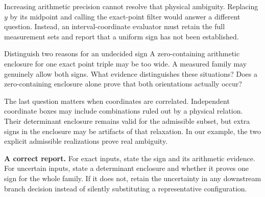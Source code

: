 Increasing arithmetic precision cannot resolve that physical ambiguity.
Replacing $y$ by its midpoint and calling the exact-point filter would
answer a different question. Instead, an interval-coordinate evaluator
must retain the full measurement sets and report that a uniform sign
has not been established.

\begin{question}{Distinguish two reasons for an undecided sign}
A zero-containing arithmetic enclosure for one exact point triple may be
too wide. A measured family may genuinely allow both signs. What evidence
distinguishes these situations? Does a zero-containing enclosure alone prove
that both orientations actually occur?
\end{question}

The last question matters when coordinates are correlated. Independent
coordinate boxes may include combinations ruled out by a physical relation.
Their determinant enclosure remains valid for the admissible subset, but
extra signs in the enclosure may be artifacts of that relaxation. In our
example, the two explicit admissible realizations prove real ambiguity.

\textbf{A correct report.} For exact inputs, state the sign and its
arithmetic evidence. For uncertain inputs, state a determinant enclosure
and whether it proves one sign for the whole family. If it does not, retain
the uncertainty in any downstream branch decision instead of silently
substituting a representative configuration.

